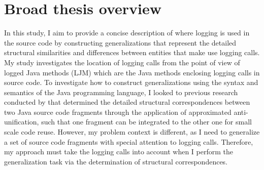 \section{Broad thesis overview} \label{intro-overview}
In this study, I aim to provide a concise description of where logging is used in the source code by constructing generalizations that represent the detailed structural similarities and differences between entities that make use logging calls. My study investigates the location of logging calls from the point of view of logged Java methods (LJM) which are the Java methods enclosing logging calls in source code. To investigate how to construct generalizations using the syntax and semantics of the Java programming language, I looked to previous research conducted by \citet{2008:fse:cottrell} that determined the detailed structural correspondences between two Java source code fragments through the application of approximated anti-unification, such that one fragment can be integrated to the other one for small scale code reuse. However, my problem context is different, as I need to generalize a set of source code fragments with special attention to logging calls. Therefore, my approach must take the logging calls into account when I perform the generalization task via the determination of structural correspondences.




